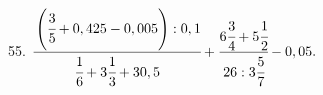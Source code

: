55. $\cfrac{\left(\cfrac{3}{5}+0,425-0,005\right):0,1}{\cfrac{1}{6}+3\cfrac{1}{3}+30,5}+\cfrac{6\cfrac{3}{4}+5\cfrac{1}{2}}{26:3\cfrac{5}{7}}-0,05.$\\
